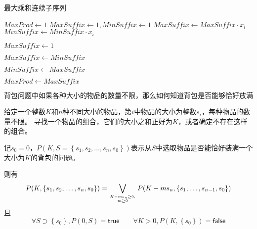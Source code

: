 \begin{questions}
\begin{solution}
        \begin{algorithm}[H]
            \caption{最大乘积连续子序列}
            \begin{algorithmic}[1]
                \State $MaxProd \gets 1$ 
                \State $MaxSuffix \gets 1, MinSuffix \gets 1$ 
                \State $MaxSuffix \gets MaxSuffix \cdot x_i$
                \State $MinSuffix \gets MinSuffix \cdot x_i$

                \State $MaxSuffix \gets 1$
                \EndIf

                \State $MaxSuffix \gets MinSuffix$
                \EndIf

                \State $MinSuffix \gets MaxSuffix$
                \EndIf

                \State $MaxProd \gets MaxSuffix$
                \EndIf
                \EndFor
            \end{algorithmic}
        \end{algorithm}
    \end{solution}



    \question 背包问题中如果各种大小的物品的数量不限，那么如何知道背包是否能够恰好放满

    {\kaishu
    给定一个整数$K$和$n$种不同大小的物品，第$i$中物品的大小为整数$s_i$，每种物品的数量不限。
    寻找一个物品的组合，它们的大小之和正好为$K$，或者确定不存在这样的组合。
    }

    \begin{solution}
        记$s_0 = 0$，$P\left(K, S=\left\{s_1, s_2, \dots, s_n, s_0\right\}\right)$表示从$S$中选取物品是否能恰好装满一个大小为$K$的背包的问题。

        则有$$
            P(K, \left\{s_1, s_2, \dots, s_n, s_0\right\}) = \bigvee_{K-ms_n \geq 0, \atop m \geq 0} P(K - ms_n, \left\{s_1, \dots, s_{n-1}, s_0\right\})
        $$
        且$$
            \forall S \supset \left\{s_0\right\},  P(0, S) = \mathsf{true} \quad\quad \forall K > 0, P(K,\left\{s_0\right\})=\mathsf{false}
        $$


\end{solution}
\end{questions}
